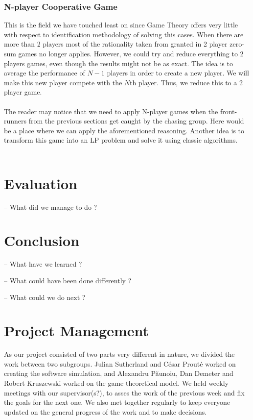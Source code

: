 \documentclass[10pt, a4paper]{report}
\begin{document}
\subsection{N-player Cooperative Game}\label{nplaycoopgame}
This is the field we have touched least on since Game Theory offers very little with respect to identification methodology of solving this cases. When there are more than 2 players most of the rationality taken from granted in 2 player zero-sum games no longer applies. However, we could try and reduce everything to 2 players games, even though the results might not be as exact. The idea is to average the performance of $N-1$ players in order to create a new player. We will make this new player compete with the $N$th player. Thus, we reduce this to a 2 player game.\\\\
The reader may notice that we need to apply N-player games when the front-runners from the previous sections get caught by the chasing group. Here would be a place where we can apply the aforementioned reasoning. Another idea is to transform this game into an LP problem and solve it using classic algorithms.
\\\\


\chapter{Evaluation}\label{ch:eval}

-- What did we manage to do ?

\chapter{Conclusion}\label{ch:concl}

-- What have we learned ?

-- What could have been done differently ?

-- What could we do next ?

\chapter{Project Management}\label{ch:projmanag}

As our project consisted of two parts very different in nature, we divided the work between two subgroups. Julian Sutherland and C\'{e}sar Prout\'{e} worked on creating the software simulation, and Alexandru P\u{a}unoiu, Dan Demeter and Robert Kruszewski worked on the game theoretical model. We held weekly meetings with our supervisor(s?), to asses the work of the previous week and fix the goals for the next one. We also met together regularly to keep everyone updated on the general progress of the work and to make decisions. \\
\end{document}

